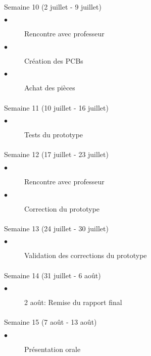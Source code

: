 \begin{multicols}{2}
		
		\paragraph{}
		Semaine 10 (2 juillet - 9 juillet)
			\begin{description}
				\item[$\bullet$] Rencontre avec professeur
				\item[$\bullet$] Création des PCBs
				\item[$\bullet$] Achat des pièces				
			\end{description}		
		
		\paragraph{}
		Semaine 11 (10 juillet - 16 juillet)
			\begin{description}
				\item[$\bullet$] Tests du prototype
			\end{description}

			
		\paragraph{}
		Semaine 12 (17 juillet - 23 juillet)
			\begin{description}
				\item[$\bullet$] Rencontre avec professeur
				\item[$\bullet$] Correction du prototype				
			\end{description}		
		
		\paragraph{}
		Semaine 13 (24 juillet - 30 juillet)
			\begin{description}
				\item[$\bullet$] Validation des corrections du prototype
			\end{description}
		
		\paragraph{}
		Semaine 14 (31 juillet - 6 août)
			\begin{description}
				\item[$\bullet$] 2 août: Remise du rapport final
			\end{description}	
			
		\paragraph{}
		Semaine 15 (7 août - 13 août)
			\begin{description}		
				\item[$\bullet$] Présentation orale
			\end{description}	
		\end{multicols}